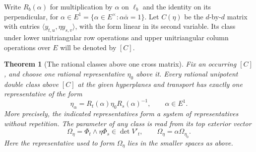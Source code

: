 \documentclass[a4paper,11pt]{article}
\newtheorem{theorem}[proposition]{Theorem}
\theoremstyle{definition}
\theoremstyle{remark}
\numberwithin{equation}{section}
\begin{document}
Write \(R_b(\alpha)\) for multiplication by \(\alpha\) on \(\ell_b\)
and the identity on its perpendicular, for
\(\alpha\in E^1=\{\alpha\in E^\times:\alpha\bar\alpha=1\}\).
Let \(C(\eta)\) be the \(d\)-by-\(d\) matrix with entries
\(\langle y_{t,u},\eta y_{s,v}\rangle\), with the form linear
in its second variable. Its class under lower unitriangular row
operations and upper unitriangular column operations over \(E\)
will be denoted by \([C]\).

\begin{theorem}[The rational classes above one cross matrix]
\leavevmode\label{thm:frameorientation611}
Fix an occurring \([C]\), and choose one rational representative
\(\eta_0\) above it. Every rational unipotent double class above
\([C]\) at the given hyperplanes and transport has exactly one
representative of the form
\[
       \eta_\alpha=R_t(\alpha)\eta_0R_s(\alpha)^{-1},
                  \qquad \alpha\in E^1 .
\]
More precisely, the indicated representatives form a system of
representatives without repetition. The parameter of any class
is read from its top exterior vector
\[
  \Omega_\eta=\Phi_t\wedge\eta\Phi_s\in\det V'_t,\qquad
             \Omega_\eta=\alpha\Omega_{\eta_0}.
\]
Here the representative used to form \(\Omega_\eta\) lies in the
smaller spaces as above.
\end{theorem}
\end{document}
